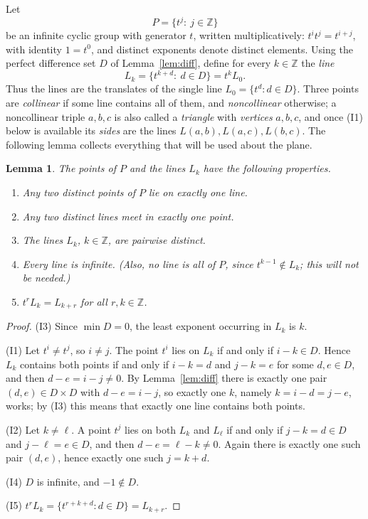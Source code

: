 \documentclass[11pt]{article}
\theoremstyle{plain}
\newtheorem{lemma}[theorem]{Lemma}
\theoremstyle{definition}
\newcommand{\Z}{\mathbb{Z}}
\begin{document}
Let
\[
 P=\{t^j:\ j\in\Z\}
\]
be an infinite cyclic group with generator $t$, written
multiplicatively: $t^it^j=t^{i+j}$, with identity $1=t^0$, and distinct
exponents denote distinct elements.  Using the perfect difference set
$D$ of Lemma~\ref{lem:diff}, define for every $k\in\Z$ the \emph{line}
\[
 L_k=\{t^{k+d}:\ d\in D\}=t^k L_0 .
\]
Thus the lines are the translates of the single line $L_0=\{t^d:d\in D\}$.
Three points are \emph{collinear} if some line contains all of them, and
\emph{noncollinear} otherwise; a noncollinear triple $a,b,c$ is also
called a \emph{triangle} with \emph{vertices} $a,b,c$, and once (I1)
below is available its \emph{sides} are the lines
$L(a,b),L(a,c),L(b,c)$.  The following lemma collects everything that
will be used about the plane.

\begin{lemma}\label{lem:incidence}
The points of $P$ and the lines $L_k$ have the following properties.
\begin{enumerate}
\item[(I1)] Any two distinct points of $P$ lie on exactly one line.
\item[(I2)] Any two distinct lines meet in exactly one point.
\item[(I3)] The lines $L_k$, $k\in\Z$, are pairwise distinct.
\item[(I4)] Every line is infinite.  (Also, no line is all of $P$, since
$t^{k-1}\notin L_k$; this will not be needed.)
\item[(I5)] $t^rL_k=L_{k+r}$ for all $r,k\in\Z$.
\end{enumerate}
\end{lemma}
\begin{proof}
(I3) Since $\min D=0$, the least exponent occurring in $L_k$ is $k$.

(I1) Let $t^i\neq t^j$, so $i\neq j$.  The point $t^i$ lies on $L_k$ if
and only if $i-k\in D$.  Hence $L_k$ contains both points if and only if
$i-k=d$ and $j-k=e$ for some $d,e\in D$, and then $d-e=i-j\neq0$.  By
Lemma~\ref{lem:diff} there is exactly one pair $(d,e)\in D\times D$ with
$d-e=i-j$, so exactly one $k$, namely $k=i-d=j-e$, works; by (I3) this
means that exactly one line contains both points.

(I2) Let $k\neq\ell$.  A point $t^j$ lies on both $L_k$ and $L_\ell$ if
and only if $j-k=d\in D$ and $j-\ell=e\in D$, and then
$d-e=\ell-k\neq0$.  Again there is exactly one such pair $(d,e)$, hence
exactly one such $j=k+d$.

(I4) $D$ is infinite, and $-1\notin D$.

(I5) $t^r L_k=\{t^{r+k+d}:d\in D\}=L_{k+r}$.
\end{proof}
\end{document}
